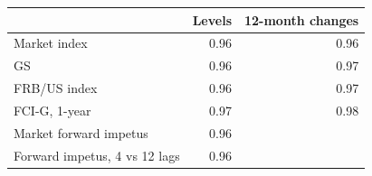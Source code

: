 \begin{tabular}{lrr}
\toprule
 & Levels & 12-month changes \\
\midrule
Market index & 0.96 & 0.96 \\
GS & 0.96 & 0.97 \\
FRB/US index & 0.96 & 0.97 \\
FCI-G, 1-year & 0.97 & 0.98 \\
Market forward impetus & 0.96 &  \\
Forward impetus, 4 vs 12 lags & 0.96 &  \\
\bottomrule
\end{tabular}
